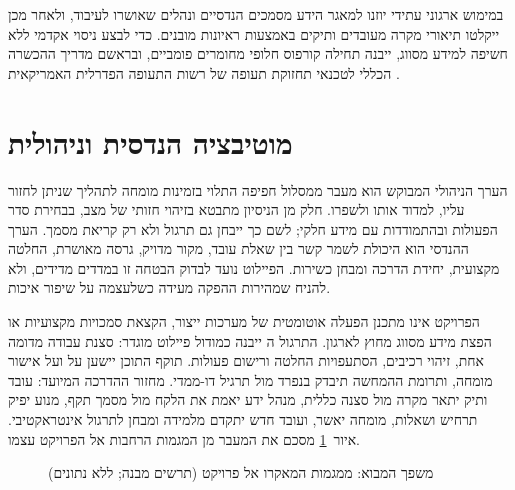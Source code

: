 במימוש ארגוני עתידי יוזנו למאגר הידע מסמכים הנדסיים ונהלים שאושרו לעיבוד, ולאחר מכן ייקלטו תיאורי מקרה מעובדים
ותיקים באמצעות ראיונות מובנים. כדי לבצע ניסוי אקדמי ללא חשיפה למידע מסווג, ייבנה תחילה קורפוס חלופי מחומרים
פומביים, ובראשם מדריך ההכשרה הכללי לטכנאי תחזוקת תעופה של רשות התעופה הפדרלית האמריקאית  \cite{faa2023amt}.

\section{מוטיבציה הנדסית וניהולית}\label{sec:motiv}
הערך הניהולי המבוקש הוא מעבר ממסלול חפיפה התלוי בזמינות מומחה לתהליך שניתן לחזור עליו, למדוד אותו ולשפרו.
חלק מן הניסיון מתבטא בזיהוי חזותי של מצב, בבחירת סדר הפעולות ובהתמודדות עם מידע חלקי; לשם כך ייבחן גם תרגול
 ולא רק קריאת מסמך. הערך ההנדסי הוא היכולת לשמר קשר בין שאלת עובד, מקור מדויק, גרסה מאושרת, החלטה
מקצועית, יחידת הדרכה ומבחן כשירות. הפיילוט נועד לבדוק הבטחה זו במדדים מדידים, ולא להניח שמהירות ההפקה מעידה
כשלעצמה על שיפור איכות.

הפרויקט אינו מתכנן הפעלה אוטומטית של מערכות ייצור, הקצאת סמכויות מקצועיות או הפצת מידע מסווג מחוץ לארגון.
התרגול ה\threeDadj{} ייבנה כמודול פיילוט מוגדר: סצנת עבודה מדומה אחת, זיהוי רכיבים, הסתעפויות החלטה ורישום פעולות.
תוקף התוכן יישען על  ועל אישור מומחה, ותרומת ההמחשה תיבדק בנפרד מול תרגיל \mbox{דו-ממדי}. מחזור ההדרכה המיועד:
עובד ותיק יתאר מקרה מול סצנה כללית, מנהל ידע יאמת את הלקח מול מסמך תקף, מנוע  יפיק תרחיש ושאלות, מומחה
יאשר, ועובד חדש יתקדם מלמידה ומבחן לתרגול אינטראקטיבי. איור~\ref{fig:funnel} מסכם את המעבר מן המגמות הרחבות אל
הפרויקט עצמו.

\begin{figure}[!htbp]
\centering
{}
\caption{משפך המבוא: ממגמות המאקרו אל פרויקט  (תרשים מבנה; ללא נתונים)}\label{fig:funnel}
\end{figure}

